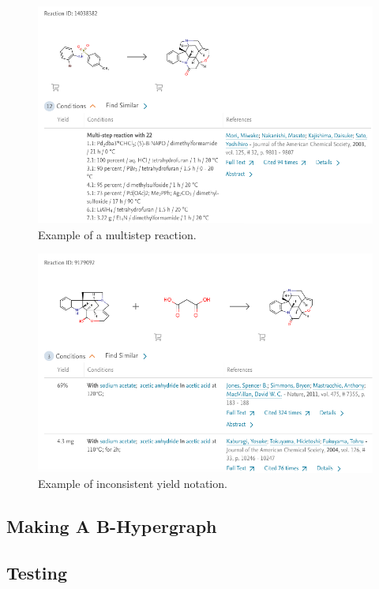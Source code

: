 \documentclass[a4paper,10pt,titlepage]{paper}
\begin{document}
\begin{figure}[H]
\hspace{-1cm}
\includegraphics[scale=0.5]{Billeder/MultistepReactions.png}
\caption{Example of a multistep reaction.}
\end{figure}

\begin{figure}[H]
\hspace{-1cm}
\includegraphics[scale=0.5]{Billeder/DifferentYieldNotation.png}
\caption{Example of inconsistent yield notation.}
\end{figure}



\subsection{Making A B-Hypergraph}
\subsection{Testing}
\end{document}
